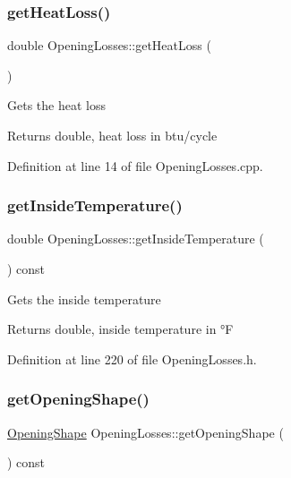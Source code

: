 \mbox{\label{class_opening_losses_a38112eb408f72e252b42a68a41a25d0f}} 
\subsubsection{\texorpdfstring{get\+Heat\+Loss()}{getHeatLoss()}}
{\footnotesize\ttfamily double Opening\+Losses\+::get\+Heat\+Loss (\begin{DoxyParamCaption}{ }\end{DoxyParamCaption})}

Gets the heat loss \begin{DoxyReturn}{Returns}
double, heat loss in btu/cycle 
\end{DoxyReturn}


Definition at line 14 of file Opening\+Losses.\+cpp.

\mbox{\label{class_opening_losses_abe930dab77b1c855503ee51fdf66c88a}} 
\subsubsection{\texorpdfstring{get\+Inside\+Temperature()}{getInsideTemperature()}}
{\footnotesize\ttfamily double Opening\+Losses\+::get\+Inside\+Temperature (\begin{DoxyParamCaption}{ }\end{DoxyParamCaption}) const\hspace{0.3cm}{\ttfamily [inline]}}

Gets the inside temperature \begin{DoxyReturn}{Returns}
double, inside temperature in °F 
\end{DoxyReturn}


Definition at line 220 of file Opening\+Losses.\+h.

\mbox{\label{class_opening_losses_a5046cd699178e4edca774d0d0da7965a}} 
\subsubsection{\texorpdfstring{get\+Opening\+Shape()}{getOpeningShape()}}
{\footnotesize\ttfamily \hyperlink{class_opening_losses_a57f9759b6fd72a1b75aa885800e26157}{Opening\+Shape} Opening\+Losses\+::get\+Opening\+Shape (\begin{DoxyParamCaption}{ }\end{DoxyParamCaption}) const\hspace{0.3cm}{\ttfamily [inline]}}

